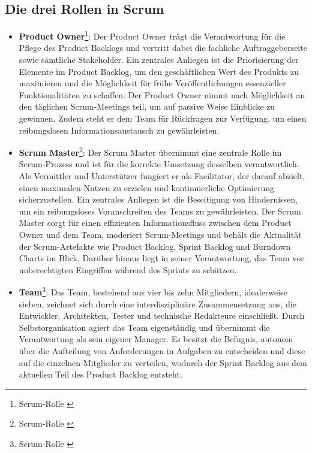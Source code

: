 \subsection{Die drei Rollen in Scrum}
\begin{itemize}
    \item \textbf{Product Owner}\footnote{Scrum-Rolle \cite{Product-Owner}}: Der Product Owner trägt die Verantwortung
    für die Pflege des Product Backlogs und vertritt dabei die fachliche Auftraggeberseite sowie sämtliche Stakeholder.
    Ein zentrales Anliegen ist die Priorisierung der Elemente im Product Backlog, um den geschäftlichen Wert des
    Produkts zu maximieren und die Möglichkeit für frühe Veröffentlichungen essenzieller Funktionalitäten zu schaffen.
    Der Product Owner nimmt nach Möglichkeit an den täglichen Scrum-Meetings teil, um auf passive Weise Einblicke zu
    gewinnen. Zudem steht er dem Team für Rückfragen zur Verfügung, um einen reibungslosen Informationsaustausch zu gewährleisten.
    \item \textbf{Scrum Master}\footnote{Scrum-Rolle \cite{Scrum-Master}}: Der Scrum Master übernimmt eine zentrale
    Rolle im Scrum-Prozess und ist für die korrekte Umsetzung desselben verantwortlich. Als Vermittler und Unterstützer
    fungiert er als Facilitator, der darauf abzielt, einen maximalen Nutzen zu erzielen und kontinuierliche Optimierung
    sicherzustellen. Ein zentrales Anliegen ist die Beseitigung von Hindernissen, um ein reibungsloses Voranschreiten
    des Teams zu gewährleisten. Der Scrum Master sorgt für einen effizienten Informationsfluss zwischen dem Product Owner
    und dem Team, moderiert Scrum-Meetings und behält die Aktualität der Scrum-Artefakte wie Product Backlog,
    Sprint Backlog und Burndown Charts im Blick. Darüber hinaus liegt in seiner Verantwortung, das Team vor
    unberechtigten Eingriffen während des Sprints zu schützen.
    \item \textbf{Team}\footnote{Scrum-Rolle \cite{Team}}: Das Team, bestehend aus vier bis zehn Mitgliedern,
    idealerweise sieben, zeichnet sich durch eine interdisziplinäre Zusammensetzung aus, die Entwickler, Architekten,
    Tester und technische Redakteure einschließt. Durch Selbstorganisation agiert das Team eigenständig und übernimmt
    die Verantwortung als sein eigener Manager. Es besitzt die Befugnis, autonom über die Aufteilung von Anforderungen
    in Aufgaben zu entscheiden und diese auf die einzelnen Mitglieder zu verteilen, wodurch der Sprint Backlog aus dem
    aktuellen Teil des Product Backlog entsteht.
\end{itemize}

